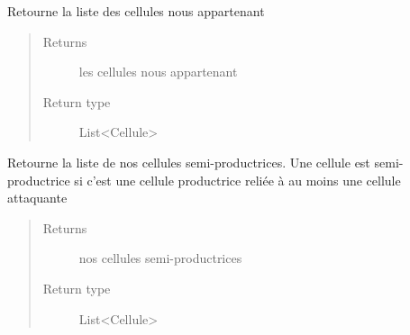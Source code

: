 \documentclass[letterpaper,10pt,english]{sphinxmanual}
\begin{document}
\begin{fulllineitems}
\begin{fulllineitems}
\begin{quote}
\begin{description}
\end{description}\end{quote}

\end{fulllineitems}


\begin{fulllineitems}
\label{index:StrategieAnalyse.StrategieAnalyse.getMesCellules}
Retourne la liste des cellules nous appartenant
\begin{quote}\begin{description}
\item[{Returns}] \leavevmode
les cellules nous appartenant

\item[{Return type}] \leavevmode
List\textless{}Cellule\textgreater{}

\end{description}\end{quote}

\end{fulllineitems}


\begin{fulllineitems}
\label{index:StrategieAnalyse.StrategieAnalyse.getSemiProductrices}
Retourne la liste de nos cellules semi-productrices.
Une cellule est semi-productrice si c'est une cellule productrice reliée à au moins une cellule attaquante
\begin{quote}\begin{description}
\item[{Returns}] \leavevmode
nos cellules semi-productrices

\item[{Return type}] \leavevmode
List\textless{}Cellule\textgreater{}

\end{description}\end{quote}

\end{fulllineitems}



\end{fulllineitems}
\end{document}

